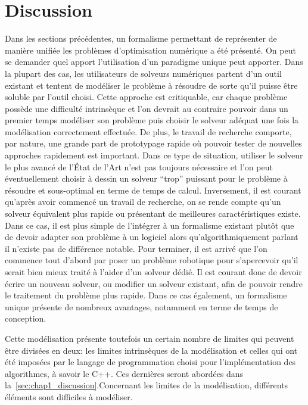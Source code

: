

\section{Discussion}
\label{sec:chap1_discussion}


Dans les sections précédentes, un formalisme permettant de représenter
de manière unifiée les problèmes d'optimisation numérique a été
présenté. On peut se demander quel apport l'utilisation d'un paradigme
unique peut apporter. Dans la plupart des cas, les utilisateurs de
solveurs numériques partent d'un outil existant et tentent de
modéliser le problème à résoudre de sorte qu'il puisse être soluble
par l'outil choisi. Cette approche est critiquable, car chaque problème
possède une difficulté intrinsèque et l'on devrait au contraire
pouvoir dans un premier temps modéliser son problème puis choisir le
solveur adéquat une fois la modélisation correctement effectuée. De
plus, le travail de recherche comporte, par nature, une grande part de
prototypage rapide où pouvoir tester de nouvelles approches rapidement
est important. Dans ce type de situation, utiliser le solveur le plus
avancé de l'État de l'Art n'est pas toujours nécessaire et l'on peut
éventuellement choisir à dessin un solveur ``trop'' puissant pour le
problème à résoudre et sous-optimal en terme de temps de
calcul. Inversement, il est courant qu'après avoir commencé un travail
de recherche, on se rende compte qu'un solveur équivalent plus rapide
ou présentant de meilleures caractéristiques existe. Dans ce cas, il
est plus simple de l'intégrer à un formalisme existant plutôt que de
devoir adapter son problème à un logiciel alors qu'algorithmiquement
parlant il n'existe pas de différence notable. Pour terminer, il est
arrivé que l'on commence tout d'abord par poser un problème robotique
pour s'apercevoir qu'il serait bien mieux traité à l'aider d'un
solveur dédié. Il est courant donc de devoir écrire un nouveau
solveur, ou modifier un solveur existant, afin de pouvoir rendre le
traitement du problème plus rapide. Dans ce cas également, un
formalisme unique présente de nombreux avantages, notamment en terme
de temps de conception.


Cette modélisation présente toutefois un certain nombre de limites qui
peuvent être divisées en deux: les limites intrinsèques de la
modélisation et celles qui ont été imposées par le langage de
programmation choisi pour l'implémentation des algorithmes, à savoir
le C++. Ces dernières seront abordées dans
la \autoref{sec:chap1_discussion}.Concernant les limites de la
modélisation, différents éléments sont difficiles à modéliser.


